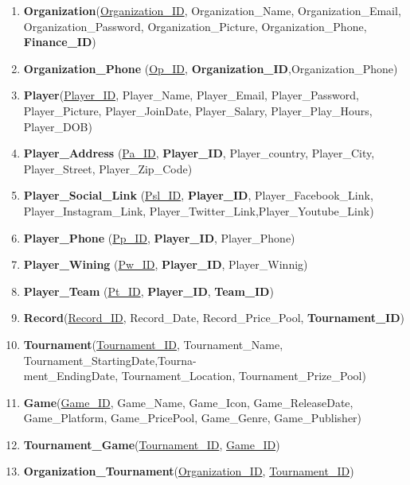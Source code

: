 \begin{enumerate}
    \item \textbf{Organization}(\underline{Organization\_ID}, Organization\_Name, Organization\_Email, Organization\_Password, Organization\_Picture, Organization\_Phone, \textbf{Finance\_ID})
    \item \textbf{Organization\_Phone} (\underline{Op\_ID}, \textbf{Organization\_ID},{Organization\_Phone})





    \item \textbf{Player}(\underline{Player\_ID}, Player\_Name, Player\_Email, Player\_Password, Player\_Picture, Player\_JoinDate, Player\_Salary, Player\_Play\_Hours, Player\_DOB)
    \item \textbf{Player\_Address} (\underline{Pa\_ID}, \textbf{Player\_ID}, Player\_country, Player\_City, Player\_Street, Player\_Zip\_Code)
    \item \textbf{Player\_Social\_Link} (\underline{Psl\_ID}, \textbf{Player\_ID}, Player\_Facebook\_Link, Player\_Instagram\_Link, Player\_Twitter\_Link,Player\_Youtube\_Link)
    \item \textbf{Player\_Phone} (\underline{Pp\_ID}, \textbf{Player\_ID}, Player\_Phone)
    \item \textbf{Player\_Wining} (\underline{Pw\_ID}, \textbf{Player\_ID}, Player\_Winnig)
    \item \textbf{Player\_Team} (\underline{Pt\_ID}, \textbf{Player\_ID}, \textbf{Team\_ID})


    \item \textbf{Record}(\underline{Record\_ID}, Record\_Date, Record\_Price\_Pool, \textbf{Tournament\_ID})
    \item \textbf{Tournament}(\underline{Tournament\_ID}, Tournament\_Name, Tournament\_StartingDate,Tourna-\\ment\_EndingDate, Tournament\_Location, Tournament\_Prize\_Pool)


    \item \textbf{Game}(\underline{Game\_ID}, Game\_Name, Game\_Icon, Game\_ReleaseDate, Game\_Platform, Game\_PricePool, Game\_Genre, Game\_Publisher)
    \item \textbf{Tournament\_Game}(\underline{Tournament\_ID}, \underline{Game\_ID})


    \item \textbf{Organization\_Tournament}(\underline{Organization\_ID}, \underline{Tournament\_ID})



\end{enumerate}
